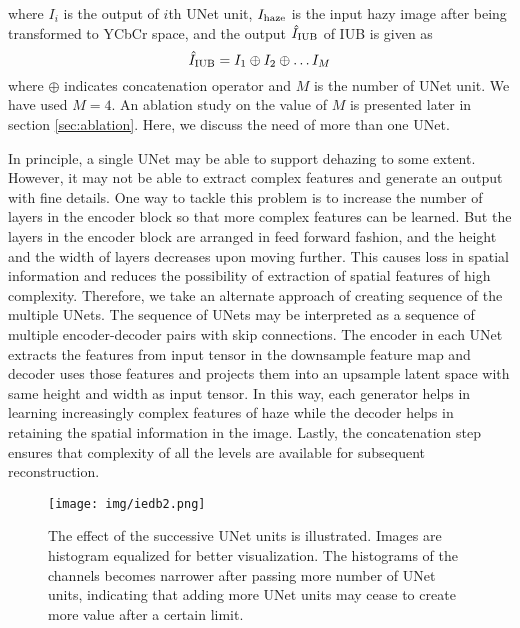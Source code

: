 \documentclass[runningheads]{llncs}
\begin{document}
\noindent where $I_i$ is the output of $i$th UNet unit, $I_{\rm haze}$ is the input hazy image after being transformed to YCbCr space, and the output $\hat{I}_{\rm IUB}$ of IUB is given as 
\begin{equation}
    \hat{I}_{\rm IUB} = I_{1}\oplus I_{2}\oplus \ldots I_{M}
\end{equation}
where $\oplus$ indicates concatenation operator and $M$ is the number of UNet unit. We have used $M=4$. An ablation study on the value of $M$ is presented later in section \ref{sec:ablation}. Here, we discuss the need of more than one UNet.

In principle, a single UNet may be able to support dehazing to some extent. However, it may not be able to extract complex features and generate an output with fine details. One way to tackle this problem is to increase the number of layers in the encoder block so that more complex features can be learned. But the layers in the encoder block are arranged in feed forward fashion, and the height and the width of layers decreases upon moving further. This causes loss in spatial information and reduces the possibility of extraction of spatial features of high complexity. Therefore, we take an alternate approach of creating sequence of the multiple UNets. The sequence of UNets may be interpreted as a sequence of multiple encoder-decoder pairs with skip connections. The encoder in each UNet extracts the features from input tensor in the downsample feature map and decoder uses those features and projects them into an upsample latent space with same height and width as input tensor. In this way, each generator helps in learning increasingly complex features of haze while the decoder helps in retaining the spatial information in the image. Lastly, the concatenation step ensures that complexity of all the levels are available for subsequent reconstruction.

\begin{figure*}[t]
\centering
\texttt{[image: img/iedb2.png]}
\caption{The effect of the successive UNet units is illustrated. Images are histogram equalized for better visualization. The histograms of the channels becomes narrower after passing more number of UNet units, indicating that adding more UNet units may cease to create more value after a certain limit.}
\label{img:iedb}
\end{figure*}
\end{document}
